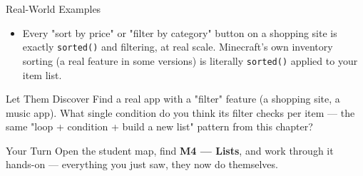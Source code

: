 \documentclass[aspectratio=169]{beamer}
\begin{document}
\begin{frame}{Real-World Examples}
    \large
    \begin{itemize}
        \item Every "sort by price" or "filter by category" button on a shopping site is exactly \texttt{sorted()} and filtering, at real scale. Minecraft's own inventory sorting (a real feature in some versions) is literally \texttt{sorted()} applied to your item list.
    \end{itemize}
\end{frame}


\begin{frame}{Let Them Discover}
    \Large
    Find a real app with a "filter" feature (a shopping site, a music app). What single condition do you think its filter checks per item — the same "loop + condition + build a new list" pattern from this chapter?
\end{frame}

\begin{frame}{Your Turn}
    \Large
    Open the student map, find \textbf{M4 — Lists}, and work through it
    hands-on --- everything you just saw, they now do themselves.
\end{frame}
\end{document}
